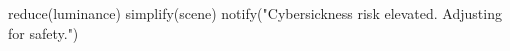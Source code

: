 \documentclass{vgtc}                          %
\newcommand{\gtan}[1]{
        \textcolor{red}{{\em\bf GT:} #1}}
\begin{document}

    
    
    




\begin{algorithm}[h]
\caption{Adaptive Mitigation on Verified Cybersickness Risk}
\begin{algorithmic}[1]
    \STATE reduce(luminance)
    \STATE simplify(scene)
    \STATE notify("Cybersickness risk elevated. Adjusting for safety.")
\ENDIF
\end{algorithmic}
\end{algorithm}
\end{document}
